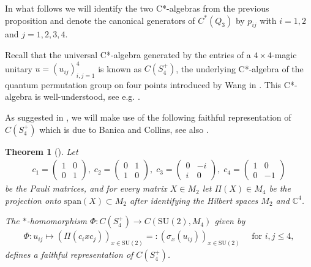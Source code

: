 \documentclass[a4paper]{amsart}
\newcommand{\C}{\mathbb{C}}
\newtheorem{thm}{Theorem}[section]
\begin{document}
In what follows we will identify the two C*-algebras from the previous proposition and denote the canonical generators of $C^\ast(Q_3)$ by $p_{ij}$ with $i=1,2$ and $j=1,2,3,4$.

Recall that the universal C*-algebra generated by the entries of a $4 \times 4$-magic unitary $u = (u_{ij})_{i,j=1}^4$ is known as $C(S_4^+)$, the underlying C*-algebra of the quantum permutation group on four points introduced by Wang in \cite{wang_quantum_1998}. This C*-algebra is well-understood, see e.g. \cite{banica_structure_2006,banica_flat_2017,banica_integration_2007,banica_representations_2009,jung_models_2020,katsura_magic_2022}. 

As suggested in \cite{banica_noncommutative_2012}, we will make use of the following faithful representation of $C(S_4^+)$ which is due to Banica and Collins, see also \cite{banica_structure_2006}.

\begin{thm}[{\cite[Theorem 4.1]{banica_integration_2008}}]
    Let 
    \begin{align*}
        c_1 = \begin{pmatrix}
            1 & 0 \\
            0 & 1
        \end{pmatrix}, \;
        c_2 = \begin{pmatrix}
            0 & 1 \\
            1 & 0
        \end{pmatrix}, \;
        c_3 = \begin{pmatrix}
            0 & -i \\
            i & 0
        \end{pmatrix}, \;
        c_4 = \begin{pmatrix}
            1 & 0 \\
            0 & -1
        \end{pmatrix}
    \end{align*}
    be the Pauli matrices, and for every matrix $X \in M_2$ let $\Pi(X) \in M_4$ be the projection onto $\mathrm{span}(X) \subset M_2$ after identifying the Hilbert spaces $M_2$ and $\C^4$. 
    
    The $\ast$-homomorphism $\Phi: C(S_4^+) \to C(\mathrm{SU}(2), M_4)$ given by
    \begin{align*}
        \Phi: u_{ij} \mapsto (\Pi(c_i x c_j))_{x \in \mathrm{SU}(2)} =: (\sigma_x(u_{ij}))_{x \in \mathrm{SU}(2)} \quad \text{ for } i,j \leq 4,
    \end{align*}
    defines a faithful representation of $C(S_4^+)$.
\end{thm}
\end{document}
